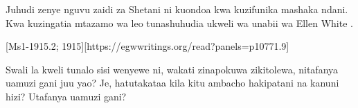 Juhudi zenye nguvu zaidi za Shetani ni kuondoa  kwa kuzifunika mashaka ndani. Kwa kuzingatia mtazamo wa leo tunashuhudia ukweli wa unabii wa Ellen White .



[Ms1-1915.2; 1915][https://egwwritings.org/read?panels=p10771.9]


Swali la kweli tunalo sisi wenyewe ni, wakati  zinapokuwa zikitolewa, nitafanya uamuzi gani juu yao? Je, hatutakataa kila kitu ambacho hakipatani na kanuni hizi? Utafanya uamuzi gani?




